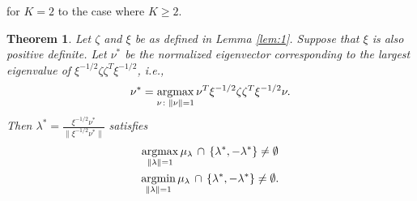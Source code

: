 \documentclass[draftcls]{IEEEtran}
\newtheorem{theorem}{Theorem}
\theoremstyle{definition}
\newcommand{\argmax}{\operatornamewithlimits{argmax}}
\newcommand{\argmin}{\operatornamewithlimits{argmin}}
\begin{document}
\cite{lee:_laten_proces_model_time_attrib_random_graph} for $K = 2$ to the case
where $K \geq 2$. 
\begin{theorem}
  \label{thm:1}
  Let $\zeta$ and $\xi$ be as defined in Lemma \ref{lem:1}.  Suppose
  that $\xi$ is also positive definite. Let $\nu^{*}$ be the
  normalized eigenvector corresponding to the largest eigenvalue of $ \xi^{-1/2}
  \zeta \zeta^{T} \xi^{-1/2}$, i.e.,
 \begin{equation}
   \label{eq:9}
  \nu^{*} = \argmax_{\nu \colon \| \nu \| = 1}
  \nu^{T} \xi^{-1/2} \zeta \zeta^{T} \xi^{-1/2}
  \nu.
 \end{equation}
 Then $\lambda^{*} = \tfrac{\xi^{-1/2} \nu^{*}}{\|\xi^{-1/2} \nu^{*} \|}$ satisfies
 \begin{gather}
   \label{eq:8}
 \argmax_{ \|\lambda\| = 1}
 \mu_{\lambda} \, \cap \, \{\lambda^{*}, - \lambda^{*}\} \not = \emptyset \\
 \argmin_{ \| \lambda \| = 1} \mu_{\lambda} \, \cap \, \{\lambda^{*}, -
 \lambda^{*}\} \not = \emptyset.
 \end{gather}
\end{theorem}
\end{document}
